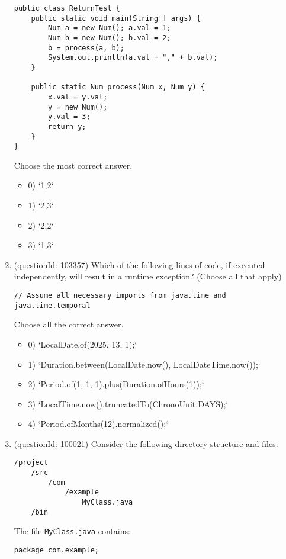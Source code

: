 \documentclass[12pt]{article}
\begin{document}
\begin{enumerate}[label=(\arabic*)]
\begin{verbatim}
public class ReturnTest {
    public static void main(String[] args) {
        Num a = new Num(); a.val = 1;
        Num b = new Num(); b.val = 2;
        b = process(a, b);
        System.out.println(a.val + "," + b.val);
    }

    public static Num process(Num x, Num y) {
        x.val = y.val;
        y = new Num();
        y.val = 3;
        return y;
    }
}
\end{verbatim}
Choose the most correct answer. 
\begin{itemize}
\item 0) `1,2`

\item 1) `2,3`

\item 2) `2,2`

\item 3) `1,3`

\end{itemize}
\item (questionId: 103357) Which of the following lines of code, if executed independently, will result in a runtime exception? (Choose all that apply)
\begin{verbatim}
// Assume all necessary imports from java.time and java.time.temporal
\end{verbatim}
Choose all the correct answer.\begin{itemize}
\item 0) `LocalDate.of(2025, 13, 1);`

\item 1) `Duration.between(LocalDate.now(), LocalDateTime.now());`

\item 2) `Period.of(1, 1, 1).plus(Duration.ofHours(1));`

\item 3) `LocalTime.now().truncatedTo(ChronoUnit.DAYS);`

\item 4) `Period.ofMonths(12).normalized();`

\end{itemize}
\item (questionId: 100021) Consider the following directory structure and files:
\begin{verbatim}
/project
    /src
        /com
            /example
                MyClass.java
    /bin
\end{verbatim}
The file \verb|MyClass.java| contains:
\begin{verbatim}
package com.example;


\end{verbatim}
\end{enumerate}
\end{document}
